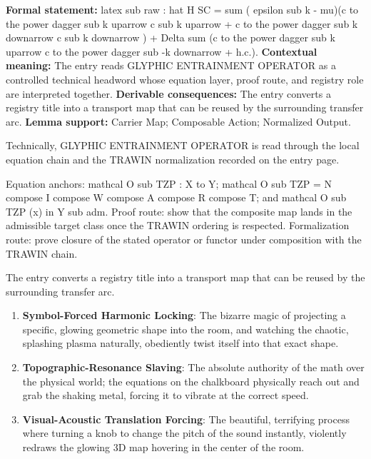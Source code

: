 \begingroup\footnotesize\setlength{\emergencystretch}{3em}\sloppy
\textbf{Formal statement:} latex sub raw : hat H SC = sum ( epsilon sub k - mu)(c to the power dagger sub k uparrow c sub k uparrow + c to the power dagger sub k downarrow c sub k downarrow ) + Delta sum (c to the power dagger sub k uparrow c to the power dagger sub -k downarrow + h.c.). \textbf{Contextual meaning:} The entry reads GLYPHIC ENTRAINMENT OPERATOR as a controlled technical headword whose equation layer, proof route, and registry role are interpreted together. \textbf{Derivable consequences:} The entry converts a registry title into a transport map that can be reused by the surrounding transfer arc. \textbf{Lemma support:} Carrier Map; Composable Action; Normalized Output.\par
\endgroup

Technically, GLYPHIC ENTRAINMENT OPERATOR is read through the local equation chain and the TRAWIN normalization recorded on the entry page.

Equation anchors: mathcal O sub TZP : X to Y; mathcal O sub TZP = N compose I compose W compose A compose R compose T; and mathcal O sub TZP (x) in Y sub adm. Proof route: show that the composite map lands in the admissible target class once the TRAWIN ordering is respected. Formalization route: prove closure of the stated operator or functor under composition with the TRAWIN chain.

The entry converts a registry title into a transport map that can be reused by the surrounding transfer arc.
\endgroup

\begin{enumerate}[leftmargin=1.6em,itemsep=6pt,topsep=4pt]
\item \textbf{Symbol-Forced Harmonic Locking}: The bizarre magic of projecting a specific, glowing geometric shape into the room, and watching the chaotic, splashing plasma naturally, obediently twist itself into that exact shape.
\item \textbf{Topographic-Resonance Slaving}: The absolute authority of the math over the physical world; the equations on the chalkboard physically reach out and grab the shaking metal, forcing it to vibrate at the correct speed.
\item \textbf{Visual-Acoustic Translation Forcing}: The beautiful, terrifying process where turning a knob to change the pitch of the sound instantly, violently redraws the glowing 3D map hovering in the center of the room.
\end{enumerate}

